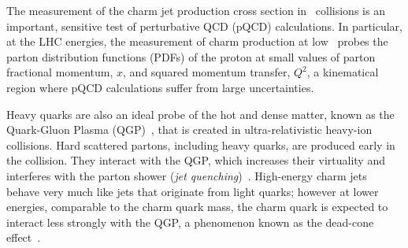\documentclass[a4paper]{jpconf}
\begin{document}
The measurement of the charm jet production cross section in \pp\ collisions is an important, sensitive test of perturbative QCD (pQCD) calculations.
In particular, at the LHC energies, the measurement of charm production at low \pT\ probes the parton distribution functions (PDFs)
of the proton at small values of parton fractional momentum, $x$, and squared momentum transfer, $Q^2$, 
a kinematical region where pQCD calculations suffer from large uncertainties.

Heavy quarks are also an ideal probe of the hot and dense matter, 
known as the Quark-Gluon Plasma (QGP)~\cite{STAR:2005a, PHENIX:2005a, ALICE:2010b, ALICE:2011b, CMS:2013d, ATLAS:2013c}, 
that is created in ultra-relativistic heavy-ion collisions. 
Hard scattered partons, including heavy quarks, are produced early in the collision. They interact with the QGP, which increases their virtuality and interferes with the
parton shower (\emph{jet quenching})~\cite{PHENIX:2003a, PHENIX:2008b, STAR:2003b, STAR:2003c, STAR:2006a, ALICE:2010d, CMS:2011c, CMS:2012b, ATLAS:2014d, ALICE:2015a}.
High-energy charm jets behave very much like jets that originate from light quarks; however at lower energies, comparable to the charm quark mass, the charm quark is expected
to interact less strongly with the QGP, a phenomenon known as the dead-cone effect~\cite{Dokshitzer:2001}.
\end{document}
